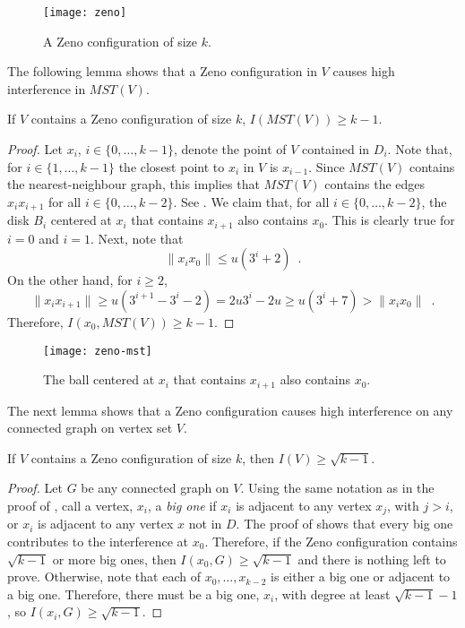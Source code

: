 \documentclass{patmorin}
\newcommand{\mst}{\mathit{MST}}
\begin{document}
\begin{figure}
  \begin{center}
    \texttt{[image: zeno]}
  \end{center}
  \caption{A Zeno configuration of size $k$.}
\end{figure}


The following lemma shows that a Zeno configuration in $V$ causes high
interference in $\mst(V)$.

\begin{lem}
If $V$ contains a Zeno configuration of size $k$, $I(\mst(V))\ge k-1$.
\end{lem}

\begin{proof}
Let $x_i$, $i\in\{0,\ldots,k-1\}$, denote the point of $V$ contained
in $D_i$.  Note that, for $i\in\{1,\ldots,k-1\}$ the closest point to
$x_i$ in $V$ is $x_{i-1}$.  Since $\mst(V)$ contains the nearest-neighbour
graph, this implies that $\mst(V)$ contains the edges $x_ix_{i+1}$ for all
$i\in\{0,\ldots,k-2\}$.  See .  We claim that, for all $i\in\{0,\ldots,k-2\}$,
the disk $B_i$ centered at $x_i$ that contains $x_{i+1}$ also contains
$x_0$.  This is clearly true for $i=0$ and $i=1$.  Next, note that
\[
  \|x_ix_0\| \le u(3^i+2) \enspace .
\]
On the other hand, for $i\ge 2$,
\[
  \|x_ix_{i+1}\| \ge u(3^{i+1}-3^i-2) = 2u3^i-2u \ge u(3^i + 7) > 
\|x_ix_0\| \enspace .
\]
Therefore, $I(x_0,\mst(V)) \ge k-1$.
\end{proof}

\begin{figure}
  \begin{center}
    \texttt{[image: zeno-mst]}
  \end{center}
  \caption{The ball centered at $x_i$ that contains $x_{i+1}$ also contains $x_0$.}
\end{figure}

The next lemma shows that a Zeno configuration causes high interference on
any connected graph on vertex set $V$.

\begin{lem}
If $V$ contains a Zeno configuration of size $k$, then $I(V)\ge\sqrt{k-1}$.
\end{lem}

\begin{proof}
Let $G$ be any connected graph on $V$.  Using the same notation as
in the proof of , call a vertex, $x_i$, a \emph{big
one} if $x_i$ is adjacent to any vertex $x_j$, with $j>i$, or $x_i$ is
adjacent to any vertex $x$ not in $D$.  The proof of 
shows that every big one contributes to the interference at $x_0$.
Therefore, if the Zeno configuration contains $\sqrt{k-1}$ or more big
ones, then $I(x_0,G)\ge\sqrt{k-1}$ and there is nothing left to prove.
Otherwise, note that each of $x_0,\ldots,x_{k-2}$ is either a big one
or adjacent to a big one. Therefore, there must be a big one, $x_i$,
with degree at least $\sqrt{k-1}-1$, so $I(x_i,G)\ge\sqrt{k-1}$.
\end{proof}
\end{document}

